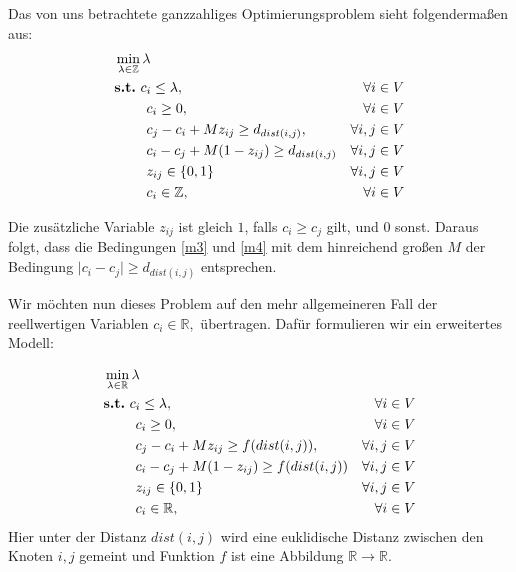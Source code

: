 \documentclass[
	fontsize=12pt,
	paper=a4,
	twoside=false,
	numbers=noenddot,
	plainheadsepline,
	toc=listof,
	toc=bibliography
]{scrartcl}
\begin{document}
Das von uns betrachtete ganzzahliges Optimierungsproblem sieht folgendermaßen aus: 
\begin{align}\label{model}
& \min_{\lambda\in\mathbb{Z}}\lambda & \\
\label{m1} & \text{\bf s.t.}\ c_{i}\le\lambda,& \forall i\in V \\
\label{m2} & \hspace{23 pt} c_{i}\ge 0, & \forall i\in V \\
\label{m3} & \hspace{23 pt} c_j-c_i + M z_{ij}\ge d_{dist(i,j)}, & \forall i,j\in V\\
\label{m4} & \hspace{23 pt} c_i-c_j + M(1-z_{ij})\ge d_{dist(i,j)}& \forall i,j\in V\\
\label{m5} & \hspace{23 pt} z_{ij}\in \{0,1\}& \forall i,j\in V \\ 
\label{m6} & \hspace{23 pt} c_{i}\in \mathbb{Z},& \forall i\in V
\end{align}

Die zusätzliche Variable $z_{ij}$ ist gleich $1$, falls $c_{i}\ge c_{j}$ gilt, und $0$ sonst. Daraus folgt, dass die Bedingungen \ref{m3} und \ref{m4} mit dem hinreichend großen $M$ der Bedingung $\lvert c_i-c_j\rvert\ge d_{dist(i,j)}$ entsprechen.

Wir möchten nun dieses Problem auf den mehr allgemeineren Fall der reellwertigen Variablen $c_i\in\mathbb{R},$ übertragen.
Dafür formulieren wir ein erweitertes Modell:

\begin{align}\label{model2}
& \min_{\lambda\in\mathbb{R}}\lambda & \\
\label{m21} & \text{\bf s.t.}\ c_{i}\le\lambda,& \forall i\in V \\
\label{m22} & \hspace{23 pt} c_{i}\ge 0, & \forall i\in V \\
\label{m23} & \hspace{23 pt} c_j-c_i + M z_{ij}\ge f({dist(i,j)}), & \forall i,j\in V\\
\label{m24} & \hspace{23 pt} c_i-c_j + M(1-z_{ij})\ge f({dist(i,j)})& \forall i,j\in V\\
\label{m25} & \hspace{23 pt} z_{ij}\in \{0,1\}& \forall i,j\in V \\
\label{m26} & \hspace{23 pt} c_{i}\in \mathbb{R},& \forall i\in V
\end{align}
Hier unter der Distanz $dist(i,j)$ wird  eine euklidische Distanz zwischen den Knoten $i,j$ gemeint und Funktion $f$ ist eine Abbildung $\mathbb{R}\rightarrow\mathbb{R}$.
\end{document}
